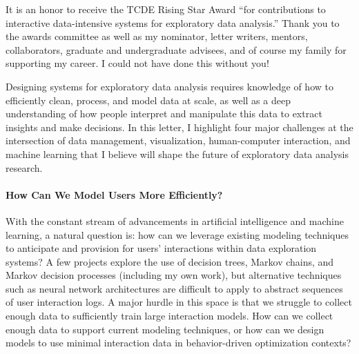 \documentclass[10pt]{article}
\title{\textbf{\mytitle\vspace{-5mm}}}
\begin{document}

It is an honor to receive the TCDE Rising Star Award ``for contributions to interactive data-intensive systems for exploratory data analysis.'' Thank you to the awards committee as well as my nominator, letter writers, mentors, collaborators, graduate and undergraduate advisees, and of course my family for supporting my career. I could not have done this without you!

Designing systems for exploratory data analysis requires knowledge of how to efficiently clean, process, and model data at scale, as well as a deep understanding of how people interpret and manipulate this data to extract insights and make decisions. In this letter, I highlight four major challenges at the intersection of data management, visualization, human-computer interaction, and machine learning that I believe will shape the future of exploratory data analysis research.

\paragraph{How Can We Model Users More Efficiently?}
With the constant stream of advancements in artificial intelligence and machine learning, a natural question is: how can we leverage existing modeling techniques to anticipate and provision for users' interactions within data exploration systems?
A few projects explore the use of decision trees, Markov chains, and Markov decision processes (including my own work), but alternative techniques such as neural network architectures are difficult to apply to abstract sequences of user interaction logs. A major hurdle in this space is that we struggle to collect enough data to sufficiently train large interaction models.
How can we collect enough data to support current modeling techniques, or how can we design models to use minimal interaction data in behavior-driven optimization contexts?
\end{document}
